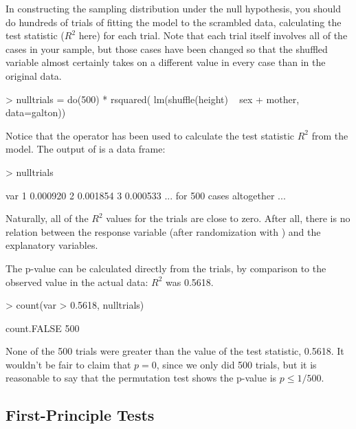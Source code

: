 In constructing the sampling distribution under the null hypothesis,
you should do hundreds of trials of fitting the model to the scrambled
data, calculating the test statistic ($R^2$ here) for each trial.  Note that each
trial itself involves all of the cases in your sample, but those cases
have been changed so that the shuffled variable almost certainly
takes on a different value in every case than in the original data.
\begin{Schunk}
\begin{Sinput}
> nulltrials = do(500) *  rsquared(
     lm(shuffle(height) ~ sex + mother, data=galton))
\end{Sinput}
\end{Schunk}
Notice that the  operator has been used to calculate
the test statistic $R^2$ from the model.  The output of 
is a data frame: 
\begin{Schunk}
\begin{Sinput}
> nulltrials
\end{Sinput}
\end{Schunk}
\begin{Schunk}
\begin{Soutput}
       var
1 0.000920
2 0.001854
3 0.000533
... for 500 cases altogether ...
\end{Soutput}
\end{Schunk}
Naturally, all of the $R^2$ values for the trials are close to zero.
After all,  there is no
relation between the response variable (after randomization with
) and the explanatory variables.

The p-value can be calculated directly from the trials, by comparison
to the observed value in the actual data: $R^2$ was 0.5618. 
\begin{Schunk}
\begin{Sinput}
> count(var > 0.5618, nulltrials)
\end{Sinput}
\begin{Soutput}
count.FALSE 
        500 
\end{Soutput}
\end{Schunk}
None of the 500 trials were greater than the value of the test statistic, 0.5618.
It wouldn't be fair to claim that $p=0$, since we only did 500 trials,
but it is reasonable to say that the permutation test shows the 
p-value is $p \leq 1/500$.


\subsection{First-Principle Tests}

